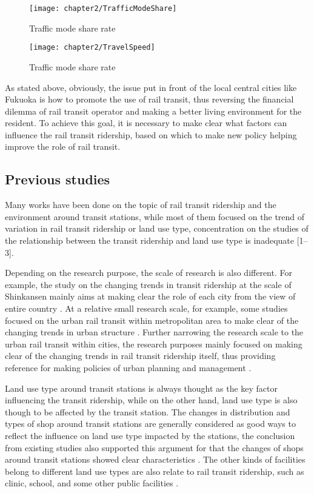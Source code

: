 %
\begin{figure}[htbp]
	\centering
	\texttt{[image: chapter2/TrafficModeShare]}
	\caption{Traffic mode share rate}
	\label{fig:chp2:TrafficModeShare}
\end{figure}

%
\begin{figure}[htbp]
	\centering
	\texttt{[image: chapter2/TravelSpeed]}
	\caption{Traffic mode share rate}
	\label{fig:chp2:TravelSpeed}
\end{figure}

%
As stated above, obviously, the issue put in front of the local central cities like Fukuoka is how to promote the use of rail transit, thus reversing the financial dilemma of rail transit operator and making a better living environment for the resident. To achieve this goal, it is necessary to make clear what factors can influence the rail transit ridership, based on which to make new policy helping improve the role of rail transit.

%
\subsection{Previous studies}
%
Many works have been done on the topic of rail transit ridership and the environment around transit stations, while most of them focused on the trend of variation in rail transit ridership or land use type, concentration on the studies of the relationship between the transit ridership and land use type is inadequate [1–3]. 

%
Depending on the research purpose, the scale of research is also different. For example, the study on the changing trends in transit ridership at the scale of Shinkansen mainly aims at making clear the role of each city from the view of entire country \cite{matsumoto2013study}. At a relative small research scale, for example, some studies focused on the urban rail transit within metropolitan area to make clear of the changing trends in urban structure \cite{song2013evaluation,baba2012change}. Further narrowing the research scale to the urban rail transit within cities, the research purposes mainly focused on making clear of the changing trends in rail transit ridership itself, thus providing reference for making policies of urban planning and management \cite{takashi2015study,yano2008}. 

%
Land use type around transit stations is always thought as the key factor influencing the transit ridership, while on the other hand, land use type is also though to be affected by the transit station. The changes in distribution and types of shop around transit stations are generally considered as good ways to reflect the influence on land use type impacted by the stations, the conclusion from existing studies also supported this argument for that the changes of shops around transit stations showed clear characteristics \cite{sui2013research,zhao2012study,kitayama2008study}. The other kinds of facilities belong to different land use types are also relate to rail transit ridership, such as clinic, school, and some other public facilities \cite{lee1995predicting,lee1994temporal}. 

